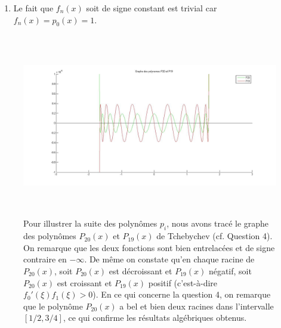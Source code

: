 \begin{enumerate}
\begin{proof}
      Comme les racines sont entrelacées, dans l'intervalle $]-\infty; \xi[$,
      il y a le même nombre de racines de $f_0$ que de racines de $f_1$.
      Ils ont donc changé de signe le même nombre de fois.
      Ils sont dès lors toujours de signe opposé comme en $-\infty$.
    \end{proof}

    Soit $\epsilon > 0$ tel que
    $f_1(x), f_0'(x) \neq 0$ $\forall x \in [\xi - \epsilon, \xi]$.
    On sait que $f_0'(\xi)f_0(\xi - \epsilon) < 0$.
    En effet, soit $q(x)$ tel que $q(\xi) \neq 0$ et
    $f_0(x) = (x - \xi) q(x)$.
    Comme $f_0(x) \neq 0$
    $\forall x \in [\xi-\epsilon;\xi[$, on a aussi
    $q(x) \neq 0$ $\forall x \in [\xi - \epsilon;\xi]$.
    On a $f_0'(x) = q(x) + (x - \xi) q'(x)$ d'où
    $f_0(\xi - \epsilon) = -\epsilon q(\xi - \epsilon)$ et
    $f_0'(\xi) = q(\xi)$.

    La fonction $q$ est un polynôme et est par conséquent continu sur $]-\infty, +\infty[$.
    Et comme il ne possède pas de racines entre $\xi - \epsilon$ et $\xi$,
    $q(\xi - \epsilon)$ et $q(\xi)$ sont de même signe.
    Avec le même raisonnement on montre que $f_1(\xi - \epsilon)$ et
    $f_1(\xi)$ sont de même signe.
    Comme $\epsilon > 0$, on peut déduire que $p_0'(\xi)$ et
    $p_0(\xi - \epsilon)$ sont de signes opposés.
    Puisqu'on sait que $p_0(\xi - \epsilon)$ et $p_1(\xi - \epsilon)$ sont
    de signe opposé, on obtient finalement $p_0'(\xi) p_1(\xi) > 0$.
  \item Le fait que $f_n(x)$ soit de signe constant est trivial car
    $f_n(x) = p_0(x) = 1$.
\end{enumerate}

\begin{figure}
  \centering
  \includegraphics[height=8cm]{fig3.jpg}
  \caption{Pour illustrer la suite des polynômes $p_i$,
  nous avons tracé le graphe des polynômes $P_{20}(x)$ et $P_{19}(x)$ de
  Tchebychev (cf. Question 4).
  On remarque que les deux fonctions sont bien entrelacées et de signe contraire en $- \infty$.
  De même on constate qu'en chaque racine de $P_{20}(x)$,
  soit $P_{20}(x)$ est décroissant et $P_{19}(x)$ négatif,
  soit $P_{20}(x)$ est croissant et $P_{19}(x)$ positif
  (c'est-à-dire $f_0'(\xi)f_1(\xi)>0$).
  En ce qui concerne la question 4, on remarque que le polynôme $P_{20}(x)$
  a bel et bien deux racines dans l'intervalle $[1/2, 3/4]$,
  ce qui confirme les résultats algébriques obtenus.}
\label{figure_Tcheb}
\end{figure}
